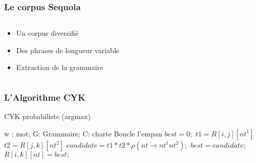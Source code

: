 \documentclass[table]{beamer}
\begin{document}

\begin{frame}
  \frametitle{Le corpus Sequoia}
  \begin{columns}
  \begin{column}{0.5\textwidth}
    \begin{itemize}
     \item{ Un corpus diversifié}
     \item{ Des phrases de longueur variable}
     \item{ Extraction de la grammaire}
     
     
    \end{itemize}
   
  \end{column}
  

  \end{columns}

\end{frame}

\begin{frame}
 \frametitle{L'Algorithme CYK}
	\begin{algorithm}[H]
	\caption{CYK probabiliste (argmax)}
		\small{\begin{algorithmic}
			 \Comment w : mot; G: Grammaire; C: charte
				 \Comment Boucle  l'empan
						 
							\State $best = 0;$
									\State $t1 = R[i,j][nt^1]$ 
									\State $t2 = R[j,k][nt^2]$
									\State $candidate = t1 * t2 * \rho(nt \rightarrow nt^1 nt^2  );$
										\State $best = candidate;$
									\EndIf
								\EndFor
							\EndFor
							\State $R[i,k][nt] = best;$
						\EndFor
					\EndFor
				\EndFor
			\EndFunction
		\end{algorithmic} }
	\end{algorithm}

\end{frame}
\end{document}
